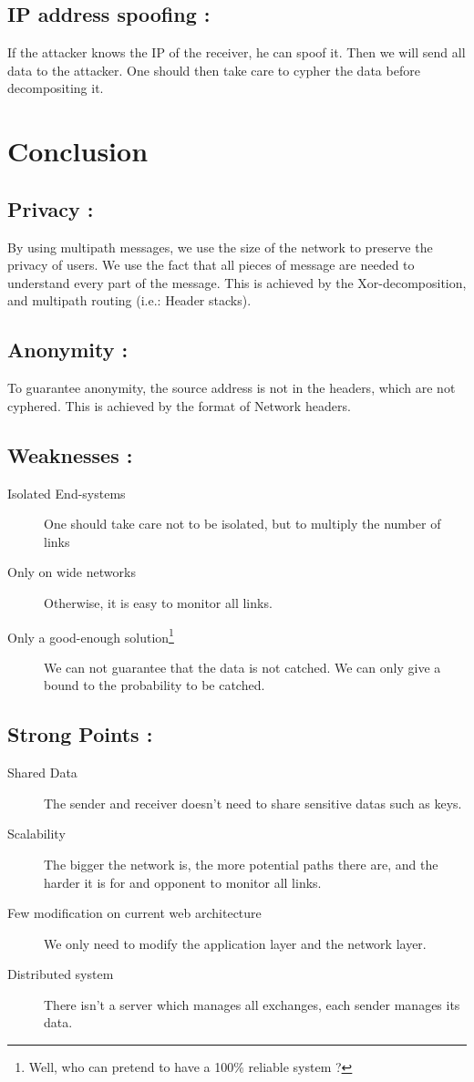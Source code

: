 \documentclass[a4paper, onecolumn, 10pt]{article}
\numberwithin{equation}{section}
\begin{document}
\subsection{IP address spoofing :}
If the attacker knows the IP of the receiver, he can spoof it. Then we will send all data to the attacker. One should then take care to cypher the data before decompositing it.

\section{Conclusion}
\subsection{Privacy :}
By using multipath messages, we use the size of the network to preserve the privacy of users. We use the fact that all pieces of message are needed to understand every part of the message. This is achieved by the Xor-decomposition, and multipath routing (i.e.: Header stacks).
\subsection{Anonymity :}
To guarantee anonymity, the source address is not in the headers, which are not cyphered. This is achieved by the format of Network headers.
\subsection{Weaknesses :}
\begin{description}
  \item[Isolated End-systems] One should take care not to be isolated, but to multiply the number of links
  \item[Only on wide networks] Otherwise, it is easy to monitor all links.
  \item[Only a good-enough solution\protect\footnote{Well, who can pretend to have a 100\% reliable system ?}] We can not guarantee that the data is not catched. We can only give a bound to the probability to be catched.
\end{description}
\subsection{Strong Points :}
\begin{description}
  \item[Shared Data] The sender and receiver doesn't need to share sensitive datas such as keys. 
  \item[Scalability] The bigger the network is, the more potential paths there are, and the harder it is for and opponent to monitor all links.
  \item[Few modification on current web architecture] We only need to modify the application layer and the network layer.
  \item[Distributed system] There isn't a server which manages all exchanges, each sender manages its data.
\end{description}
\end{document}
